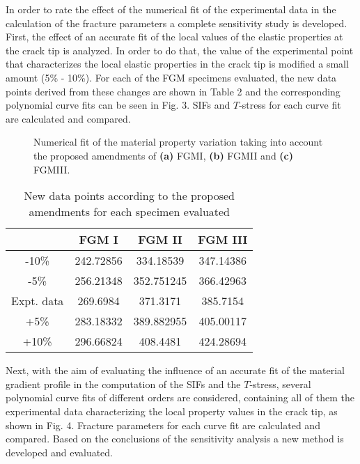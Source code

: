 In order to rate the effect of the numerical fit of the experimental data in the calculation of the fracture parameters a complete sensitivity study is developed. First, the effect of an accurate fit of the local values of the elastic properties at the crack tip is analyzed. In order to do that, the value of the experimental point that characterizes the local elastic properties in the crack tip is modified a small amount (5\% - 10\%). For each of the FGM specimens evaluated, the new data points derived from these changes are shown in Table 2 and the corresponding polynomial curve fits can be seen in Fig. 3. SIFs and $T$-stress for each curve fit are calculated and compared.\\

\begin{figure*}[!ht]
    \hfill
    
    \centering
    \caption{Numerical fit of the material property variation taking into account the proposed amendments of \textbf{(a)} FGMI, \textbf{(b)} FGMII and \textbf{(c)} FGMIII.}
    \label{fig:Fig3}
\end{figure*}

\begin{table}[h]
\caption{New data points according to the proposed amendments for each specimen evaluated}
\centering
\begin{tabular}{c c c c} 
\hline \hline
& FGM I & FGM II & FGM III\\
 \hline
 -10\% & 242.72856 & 334.18539 & 347.14386\\
 -5\% & 256.21348 & 352.751245 & 366.42963\\ 
 Expt. data & 269.6984 & 371.3171 & 385.7154\\
 +5\% & 283.18332 & 389.882955 & 405.00117\\
 +10\% & 296.66824 & 408.4481 & 424.28694\\
 \hline \hline 
\end{tabular}
\label{tab:Table2}
\end{table}

Next, with the aim of evaluating the influence of an accurate fit of the material gradient profile in the computation of the SIFs and the $T$-stress, several polynomial curve fits of different orders are considered, containing all of them the experimental data characterizing the local property values in the crack tip, as shown in Fig. 4. Fracture parameters for each curve fit are calculated and compared. Based on the conclusions of the sensitivity analysis a new method is developed and evaluated.

